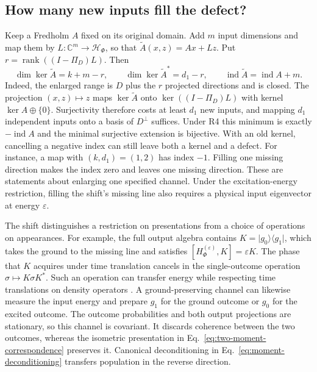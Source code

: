 \documentclass[11pt]{article}
\theoremstyle{definition}
\DeclareMathOperator{\rank}{rank}
\newcommand{\C}{\mathbb C}
\newcommand{\ket}[1]{\lvert #1\rangle}
\newcommand{\bra}[1]{\langle #1\rvert}
\begin{document}
\subsection{How many new inputs fill the defect?}

Keep a Fredholm $A$ fixed on its original domain. Add $m$ input dimensions and map them by $L:\C^m\to\mathcal H_\Phi$, so that $\widetilde A(x,z)=Ax+Lz$. Put $r=\rank((I-\Pi_D)L)$. Then
\begin{equation}
 \dim\ker\widetilde A=k+m-r,\qquad
 \dim\ker\widetilde A^*=d_1-r,\qquad
 \operatorname{ind}\widetilde A=\operatorname{ind}A+m .
 \label{eq:index-extension-counts}
\end{equation}
Indeed, the enlarged range is $D$ plus the $r$ projected directions and is closed. The projection $(x,z)\mapsto z$ maps $\ker\widetilde A$ onto $\ker((I-\Pi_D)L)$ with kernel $\ker A\oplus\{0\}$. Surjectivity therefore costs at least $d_1$ new inputs, and mapping $d_1$ independent inputs onto a basis of $D^\perp$ suffices. Under R4 this minimum is exactly $-\operatorname{ind}A$ and the minimal surjective extension is bijective. With an old kernel, cancelling a negative index can still leave both a kernel and a defect. For instance, a map with $(k,d_1)=(1,2)$ has index $-1$. Filling one missing direction makes the index zero and leaves one missing direction. These are statements about enlarging one specified channel. Under the excitation-energy restriction, filling the shift's missing line also requires a physical input eigenvector at energy $\varepsilon$.

The shift distinguishes a restriction on presentations from a choice of operations on appearances. For example, the full output algebra contains $K=\ket{g_0}\bra{g_1}$, which takes the ground to the missing line and satisfies $[H_\Phi^{(\varepsilon)},K]=\varepsilon K$. The phase that $K$ acquires under time translation cancels in the single-outcome operation $\sigma\mapsto K\sigma K^*$. Such an operation can transfer energy while respecting time translations on density operators \cite{Janzing}. A ground-preserving channel can likewise measure the input energy and prepare $g_1$ for the ground outcome or $g_0$ for the excited outcome. The outcome probabilities and both output projections are stationary, so this channel is covariant. It discards coherence between the two outcomes, whereas the isometric presentation in Eq.~\eqref{eq:two-moment-correspondence} preserves it. Canonical deconditioning in Eq.~\eqref{eq:moment-deconditioning} transfers population in the reverse direction.
\end{document}

